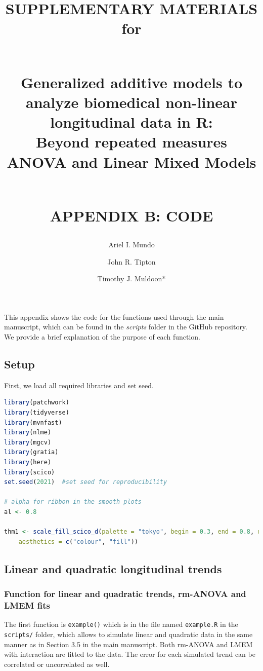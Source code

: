 \documentclass[
]{article}
\author{Ariel I. Mundo \orcidaffila{}}
\author{John R. Tipton \orcidaffilb{}}
\author{Timothy J. Muldoon*}
\affil{tmuldoon@uark.edu}
\title{SUPPLEMENTARY MATERIALS for\\
\strut \\
\textbf{Generalized additive models to analyze biomedical non-linear longitudinal data in R:}\\
Beyond repeated measures ANOVA and Linear Mixed Models\\
\strut \\
APPENDIX B: CODE}
\author{}
\date{\vspace{-2.5em}}
\newcommand{\passthrough}[1]{#1}
\begin{document}
\maketitle

\newpage


This appendix shows the code for the functions used through the main manuscript, which can be found in the \emph{scripts} folder in the GitHub repository. We provide a brief explanation of the purpose of each function.

\hypertarget{setup}{%
\subsection{Setup}\label{setup}}

First, we load all required libraries and set seed.

\begin{lstlisting}[language=R]
library(patchwork)
library(tidyverse)
library(mvnfast)
library(nlme)
library(mgcv)
library(gratia)
library(here)
library(scico)
set.seed(2021)  #set seed for reproducibility

# alpha for ribbon in the smooth plots
al <- 0.8

thm1 <- scale_fill_scico_d(palette = "tokyo", begin = 0.3, end = 0.8, direction = -1,
    aesthetics = c("colour", "fill"))
\end{lstlisting}

\hypertarget{linear-and-quadratic-longitudinal-trends}{%
\subsection{Linear and quadratic longitudinal trends}\label{linear-and-quadratic-longitudinal-trends}}

\hypertarget{function-for-linear-and-quadratic-trends-rm-anova-and-lmem-fits}{%
\subsubsection{Function for linear and quadratic trends, rm-ANOVA and LMEM fits}\label{function-for-linear-and-quadratic-trends-rm-anova-and-lmem-fits}}

The first function is \passthrough{\lstinline!example()!} which is in the file named \passthrough{\lstinline!example.R!} in the \passthrough{\lstinline!scripts/!} folder, which allows to simulate linear and quadratic data in the same manner as in Section 3.5 in the main manuscript. Both rm-ANOVA and LMEM with interaction are fitted to the data. The error for each simulated trend can be correlated or uncorrelated as well.
\end{document}
